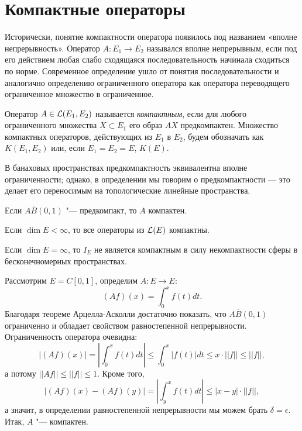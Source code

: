 \documentclass[main]{subfiles}
\begin{document}
\section{Компактные операторы}

Исторически, понятие компактности оператора
появилось под названием «вполне непрерывность».
Оператор \( A : E_1 \to E_2 \)
назывался вполне непрерывным, если
под его действием любая слабо сходящаяся последовательность
начинала сходиться по норме.
Современное определение ушло от понятия последовательности
и аналогично определению ограниченного оператора
как оператора переводящего ограниченное множество в ограниченное.

\begin{definition}
  Оператор \( A \in \Linears{E_1, E_2} \)
  называется \emph{компактным}, если
  для любого ограниченного множества \( X \subset E_1 \)
  его образ \( A X \) предкомпактен.
  Множество компактных операторов, действующих
  из \( E_1 \) в \( E_2 \), будем обозначать как
  \( K(E_1, E_2) \) или, если \( E_1 = E_2 = E \),
  \( K(E) \).
\end{definition}

\begin{remark}
  В банаховых пространствах
  предкомпактность эквивалентна вполне ограниченности;
  однако, в определении мы говорим о предкомпактности —
  это делает его переносимым на топологические линейные пространства.
\end{remark}

\begin{exercise}
  Если \( A \overline{B}(0, 1) \) "--- предкомпакт,
  то \( A \) компактен.
\end{exercise}

\begin{exampleslist}
  \item Если \( \dim E < \infty \), то все операторы из
    \( \Linears{E} \) компактны.
  \item Если \( \dim E = \infty \), то \( I_E \) не является компактным
    в силу некомпактности сферы в бесконечномерных пространствах.
  \item
    Рассмотрим \( E = C[0, 1] \), определим \( A : E \to E \):
    \[
      (Af)(x) = \int_0^x f(t) dt.
    \]
    Благодаря теореме Арцелла-Асколли достаточно показать, что
    \( A \overline{B}(0, 1) \) ограниченно и обладает
    свойством равностепенной непрерывности.
    Ограниченность оператора очевидна:
    \[
      |(Af)(x)| = |\int_0^x f(t) dt| \le
      \int_0^x |f(t)| dt \le x \cdot ||f|| \le ||f||,
    \]
    а потому \( ||Af|| \le ||f|| \le 1 \).
    Кроме того,
    \[
      |(Af)(x) - (Af)(y)| =
      \left|\int_y^x f(t) dt \right| \le |x - y| \cdot ||f||,
    \]
    а значит, в определении равностепенной непрерывности
    мы можем брать \( \delta = \epsilon \).
    Итак, \( A \) "--- компактен.
\end{exampleslist}
\end{document}
